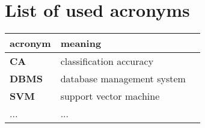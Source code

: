 \chapter*{List of used acronyms }

\begin{tabular}{l|l|l}
  {\bf acronym} & {\bf meaning}  \\ \hline
  {\bf CA} & classification accuracy \\
  {\bf DBMS} & database management system \\
  {\bf SVM} & support vector machine \\
  ... & ... \\
\end{tabular}